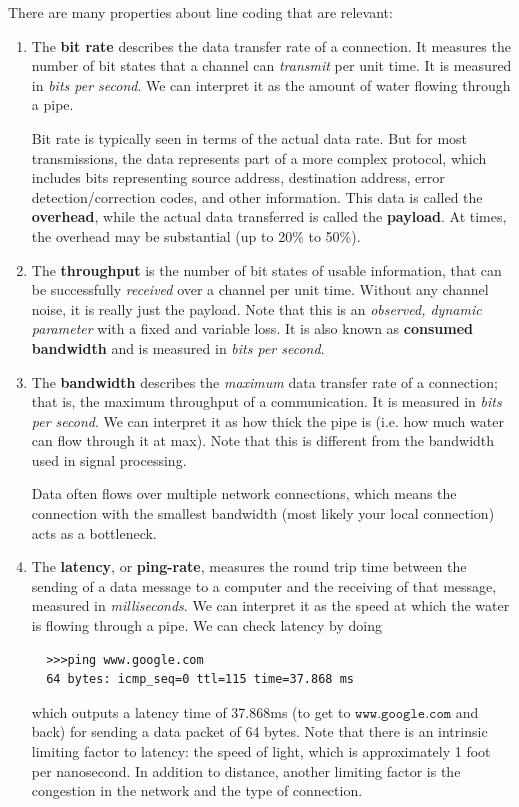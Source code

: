 \documentclass{article}
\begin{document}
  \begin{definition}
  There are many properties about line coding that are relevant:
  \begin{enumerate}
      \item The \textbf{bit rate} describes the data transfer rate of a connection. It measures the number of bit states that a channel can \textit{transmit} per unit time. It is measured in \textit{bits per second}. We can interpret it as the amount of water flowing through a pipe. 
      
      Bit rate is typically seen in terms of the actual data rate. But for most transmissions, the data represents part of a more complex protocol, which includes bits representing source address, destination address, error detection/correction codes, and other information. This data is called the \textbf{overhead}, while the actual data transferred is called the \textbf{payload}. At times, the overhead may be substantial (up to 20\% to 50\%). 

      \item The \textbf{throughput} is the number of bit states of usable information, that can be successfully \textit{received} over a channel per unit time. Without any channel noise, it is really just the payload. Note that this is an \textit{observed, dynamic parameter} with a fixed and variable loss. It is also known as \textbf{consumed bandwidth} and is measured in \textit{bits per second}. 
      
      \item The \textbf{bandwidth} describes the \textit{maximum} data transfer rate of a connection; that is, the maximum throughput of a communication. It is measured in \textit{bits per second}. We can interpret it as how thick the pipe is (i.e. how much water can flow through it at max). Note that this is different from the bandwidth used in signal processing. 
      
      Data often flows over multiple network connections, which means the connection with the smallest bandwidth (most likely your local connection) acts as a bottleneck. 
      
      \item The \textbf{latency}, or \textbf{ping-rate}, measures the round trip time between the sending of a data message to a computer and the receiving of that message, measured in \textit{milliseconds}. We can interpret it as the speed at which the water is flowing through a pipe. We can check latency by doing
      \begin{lstlisting}
  >>>ping www.google.com
  64 bytes: icmp_seq=0 ttl=115 time=37.868 ms
      \end{lstlisting}
      which outputs a latency time of 37.868ms (to get to $\texttt{www.google.com}$ and back) for sending a data packet of 64 bytes. Note that there is an intrinsic limiting factor to latency: the speed of light, which is approximately 1 foot per nanosecond. In addition to distance, another limiting factor is the congestion in the network and the type of connection. 
  \end{enumerate}
  \end{definition}
\end{document}
